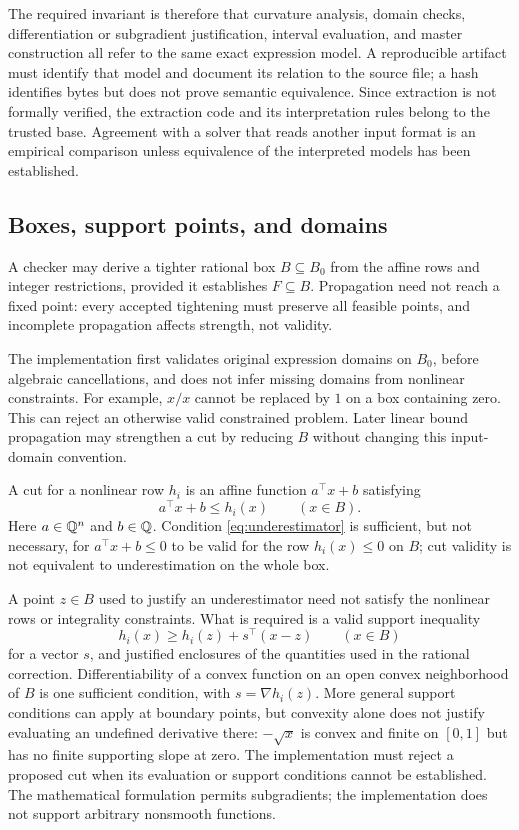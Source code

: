 The required invariant is therefore that curvature analysis, domain checks, differentiation or subgradient justification, interval evaluation, and master construction all refer to the same exact expression model. A reproducible artifact must identify that model and document its relation to the source file; a hash identifies bytes but does not prove semantic equivalence. Since extraction is not formally verified, the extraction code and its interpretation rules belong to the trusted base. Agreement with a solver that reads another input format is an empirical comparison unless equivalence of the interpreted models has been established.

\subsection{Boxes, support points, and domains}
A checker may derive a tighter rational box $B\subseteq B_0$ from the affine rows and integer restrictions, provided it establishes $F\subseteq B$. Propagation need not reach a fixed point: every accepted tightening must preserve all feasible points, and incomplete propagation affects strength, not validity.

The implementation first validates original expression domains on $B_0$, before algebraic cancellations, and does not infer missing domains from nonlinear constraints. For example, $x/x$ cannot be replaced by $1$ on a box containing zero. This can reject an otherwise valid constrained problem. Later linear bound propagation may strengthen a cut by reducing $B$ without changing this input-domain convention.

A cut for a nonlinear row $h_i$ is an affine function $a^\top x+b$ satisfying
\begin{equation}
 a^\top x+b\leq h_i(x)\qquad(x\in B).
 \label{eq:underestimator}
\end{equation}
Here $a\in\mathbb{Q}^n$ and $b\in\mathbb{Q}$. Condition \eqref{eq:underestimator} is sufficient, but not necessary, for $a^\top x+b\leq0$ to be valid for the row $h_i(x)\leq0$ on $B$; cut validity is not equivalent to underestimation on the whole box.

A point $z\in B$ used to justify an underestimator need not satisfy the nonlinear rows or integrality constraints. What is required is a valid support inequality
\begin{equation}
 h_i(x)\geq h_i(z)+s^\top(x-z)\qquad(x\in B)
 \label{eq:support-contract}
\end{equation}
for a vector $s$, and justified enclosures of the quantities used in the rational correction. Differentiability of a convex function on an open convex neighborhood of $B$ is one sufficient condition, with $s=\nabla h_i(z)$. More general support conditions can apply at boundary points, but convexity alone does not justify evaluating an undefined derivative there: $-\sqrt{x}$ is convex and finite on $[0,1]$ but has no finite supporting slope at zero. The implementation must reject a proposed cut when its evaluation or support conditions cannot be established. The mathematical formulation permits subgradients; the implementation does not support arbitrary nonsmooth functions.

